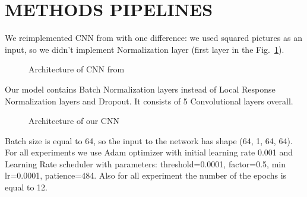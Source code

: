 \section{METHODS PIPELINES}
\label{METHODS PIPELINES}

We reimplemented CNN from \cite{Feng2017} with one difference: we used squared pictures as an input, so we didn't implement Normalization layer (first layer in the Fig.~\ref{ris:CNN_feng2017}).
\begin{figure}[ht]
	\caption{Architecture of CNN from \cite{Feng2017}}
	\label{ris:CNN_feng2017}
\end{figure}

Our model contains Batch Normalization layers instead of Local Response Normalization layers and Dropout.
It consists of 5 Convolutional layers overall.
\begin{figure}[ht]
	\caption{Architecture of our CNN}
	\label{ris:CNN_our}
\end{figure}

Batch size is equal to 64, so the input to the network has shape (64, 1, 64, 64).
For all experiments we use Adam optimizer with initial learning rate 0.001 and Learning Rate scheduler with parameters: threshold=0.0001, factor=0.5, min lr=0.0001, patience=484.
Also for all experiment the number of the epochs is equal to 12.

